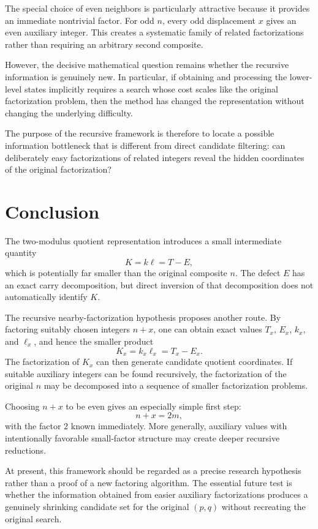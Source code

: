 \documentclass[11pt,a4paper]{article}
\begin{document}
The special choice of even neighbors is particularly attractive because it
provides an immediate nontrivial factor. For odd $n$, every odd displacement
$x$ gives an even auxiliary integer. This creates a systematic family of
related factorizations rather than requiring an arbitrary second composite.

However, the decisive mathematical question remains whether the recursive
information is genuinely new. In particular, if obtaining and processing
the lower-level states implicitly requires a search whose cost scales like
the original factorization problem, then the method has changed the
representation without changing the underlying difficulty.

The purpose of the recursive framework is therefore to locate a possible
information bottleneck that is different from direct candidate filtering:
can deliberately easy factorizations of related integers reveal the hidden
coordinates of the original factorization?

\section{Conclusion}

The two-modulus quotient representation introduces a small intermediate
quantity
\[
    K=k\ell=T-E,
\]
which is potentially far smaller than the original composite $n$.
The defect $E$ has an exact carry decomposition, but direct inversion of
that decomposition does not automatically identify $K$.

The recursive nearby-factorization hypothesis proposes another route. By
factoring suitably chosen integers $n+x$, one can obtain exact values
$T_x$, $E_x$, $k_x$, and $\ell_x$, and hence the smaller product
\[
    K_x=k_x\ell_x=T_x-E_x.
\]
The factorization of $K_x$ can then generate candidate quotient coordinates.
If suitable auxiliary integers can be found recursively, the factorization
of the original $n$ may be decomposed into a sequence of smaller
factorization problems.

Choosing $n+x$ to be even gives an especially simple first step:
\[
    n+x=2m,
\]
with the factor $2$ known immediately. More generally, auxiliary values
with intentionally favorable small-factor structure may create deeper
recursive reductions.

At present, this framework should be regarded as a precise research
hypothesis rather than a proof of a new factoring algorithm. The essential
future test is whether the information obtained from easier auxiliary
factorizations produces a genuinely shrinking candidate set for the
original $(p,q)$ without recreating the original search.
\end{document}
